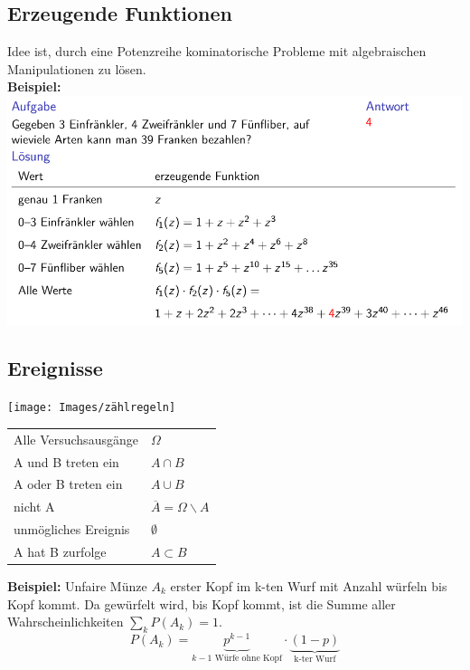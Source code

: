 \subsection{Erzeugende Funktionen}
Idee ist, durch eine Potenzreihe kominatorische Probleme mit algebraischen Manipulationen zu lösen.\\
\textbf{Beispiel:}\\
\includegraphics[width=\columnwidth]{Images/erzeugendeFunktion}


\subsection{Ereignisse}
\begin{center}
	\texttt{[image: Images/zählregeln]}
\end{center}

\begin{table}[H]
	\centering
	\begin{tabular}{l|l}
		Alle Versuchsausgänge & $\Omega$ \\
		A und B treten ein & $A \cap B$ \\
		A oder B treten ein & $A \cup B$ \\
		nicht A & $\overline{A} = \Omega \backslash A$ \\
		unmögliches Ereignis & $\emptyset$ \\
		A hat B zurfolge & $A \subset B$ \\
	\end{tabular}
\end{table}
\noindent\textbf{Beispiel:} Unfaire Münze $A_k$ erster Kopf im k-ten Wurf mit Anzahl würfeln bis Kopf kommt. Da gewürfelt wird, bis Kopf kommt, ist die Summe aller Wahrscheinlichkeiten $\sum\limits_{k}P(A_k) = 1$.
\[P(A_k) =\underbrace{ p^{k-1}}_{k-1\text{ Würfe ohne Kopf}}\cdot \underbrace{(1-p)}_{\text{k-ter Wurf}}\]


